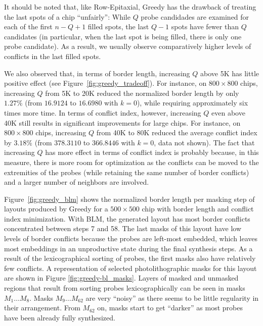It should be noted that, like Row-Epitaxial, Greedy has the drawback of treating
the last spots of a chip ``unfairly'': While $Q$ probe candidades are examined
for each of the first $n - Q + 1$ filled spots, the last $Q - 1$ spots have
fewer than $Q$ candidates (in particular, when the last spot is being filled,
there is only one probe candidate). As a result, we usually observe
comparatively higher levels of conflicts in the last filled spots.

We also observed that, in terms of border length, increasing $Q$ above 5K has
little positive effect (see Figure~\ref{fig:greedy_tradeoff}). For instance, on
$800\times 800$ chips, increasing $Q$ from 5K to 20K reduced the normalized
border length by only $1.27\%$ (from $16.9124$ to $16.6980$ with $k=0$), while
requiring approximately six times more time. In terms of conflict index,
however, increasing $Q$ even above 40K still results in significant improvements
for large chips. For instance, on $800\times 800$ chips, increasing $Q$ from 40K
to 80K reduced the average conflict index by $3.18\%$ (from $378.3110$ to
$366.8446$ with $k=0$, data not shown). The fact that increasing $Q$ has more
effect in terms of conflict index is probably because, in this measure, there is
more room for optimization as the conflicts can be moved to the extremities of
the probes (while retaining the same number of border conflicts) and a larger
number of neighbors are involved.

Figure~\ref{fig:greedy_blm} shows the normalized border length per masking step
of layouts produced by Greedy for a $500\times 500$ chip with border length and
conflict index minimization. With BLM, the generated layout has most border
conflicts concentrated between steps 7 and 58. The last masks of this layout
have low levels of border conflicts because the probes are left-most embedded,
which leaves most embeddings in an unproductive state during the final synthesis
steps. As a result of the lexicographical sorting of probes, the first masks
also have relatively few conflicts. A representation of selected
photolithographic masks for this layout are shown in Figure
\ref{fig:greedy-bl_masks}. Layers of masked and unmasked regions that result
from sorting probes lexicographically can be seen in masks $M_1 \dots M_8$.
Masks $M_9 \dots M_{62}$ are very ``noisy'' as there seems to be little
regularity in their arrangement. From $M_{62}$ on, masks start to get ``darker''
as most probes have been already fully synthesized.

